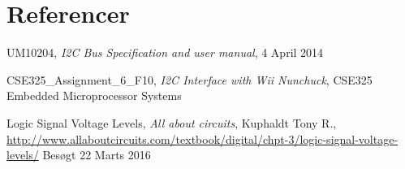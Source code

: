 \chapter{Referencer}

\begin{thebibliography}{9}
	
	UM10204,
	\textit{I2C Bus Specification and user manual}, 4 April 2014
	
	CSE325\_Assignment\_6\_F10,
	\textit{I2C Interface with Wii Nunchuck}, CSE325 Embedded Microprocessor Systems
	
	
	Logic Signal Voltage Levels,
	\textit{All about circuits},
	Kuphaldt Tony R.,\newline
	\url{http://www.allaboutcircuits.com/textbook/digital/chpt-3/logic-signal-voltage-levels/} 
	Besøgt 22 Marts 2016
	
	
\end{thebibliography}
